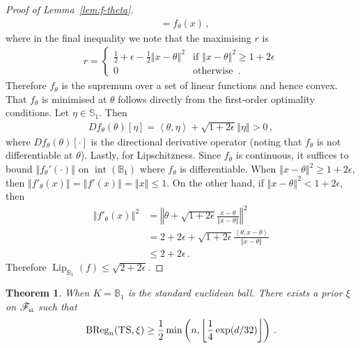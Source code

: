 \documentclass[letter, 12pt]{report}
\newcommand{\pb}{\text{\tiny\texttt{b}}}
\newcommand{\pl}{\text{\tiny\texttt{l}}}
\newcommand{\floor}[1]{\left\lfloor #1 \right\rfloor}
\newcommand{\ip}[1]{\left \langle #1 \right \rangle}
\newcommand{\BReg}{\textrm{BReg}}
\newcommand{\sphere}{\mathbb{S}}
\newcommand{\ball}{\mathbb{B}}
\newcommand{\norm}[1]{\left \Vert  #1 \right \Vert}
\newcommand{\sF}{\mathscr F}
\newcommand{\lip}{\operatorname{Lip}}
\newcommand{\interior}{\operatorname{int}}
\newcommand{\1}{\mathbf{1}}
\newcommand{\ts}{\textsc{TS}\xspace}
\theoremstyle{plain}
\newtheorem{theorem}{Theorem}
\theoremstyle{definition}
\theoremstyle{remark}
\begin{document}
\begin{proof}[Proof of Lemma~\ref{lem:f-theta}]
\begin{align}
         & = f_\theta(x) \,,\nonumber
    \end{align}
    where in the final inequality we note that the maximising $r$ is
    \begin{align*}
        r = \begin{cases}
                \frac{1}{2} + \epsilon - \frac{1}{2}\norm{x - \theta}^2 & \text{if } \norm{x - \theta}^2 \geq 1 + 2\epsilon \\
                0                                                       & \text{otherwise } \,.
            \end{cases}
    \end{align*}
    Therefore $f_\theta$ is the supremum over a set of linear functions and hence convex.
    That $f_\theta$ is minimised at $\theta$ follows directly from the first-order optimality conditions.
    Let $\eta \in \sphere_1$. Then
    \begin{align*}
        Df_\theta(\theta)[\eta] = \ip{\theta, \eta} + \sqrt{1 + 2 \epsilon} \norm{\eta} > 0 \,,
    \end{align*}
    where $Df_\theta(\theta)[\cdot]$ is the directional derivative operator (noting that $f_\theta$ is not differentiable at $\theta$).
    Lastly, for Lipschitzness. Since $f_\theta$ is continuous, it suffices to bound $\norm{f_\theta'(\cdot)}$ on $\interior(\ball_1)$ where $f_\theta$ is
    differentiable.
    When $\norm{x - \theta}^2 \geq 1 + 2 \epsilon$, then $\norm{f'_\theta(x)} = \norm{f'(x)} = \norm{x} \leq 1$.
    On the other hand, if $\norm{x - \theta}^2 < 1 + 2 \epsilon$, then
    \begin{align*}
        \norm{f'_\theta(x)}^2
         & = \norm{\theta + \sqrt{1 + 2\epsilon} \frac{x - \theta}{\norm{x - \theta}}}^2            \\
         & = 2 + 2\epsilon + \sqrt{1 + 2\epsilon} \frac{\ip{\theta, x - \theta}}{\norm{x - \theta}} \\
         & \leq 2 + 2\epsilon \,.
    \end{align*}
    Therefore $\lip_{\ball_1}(f) \leq \sqrt{2 + 2\epsilon}$.
\end{proof}

\begin{theorem}\label{thm:ts-lower}
    When $K = \ball_1$ is the standard euclidean ball.
    There exists a prior $\xi$ on $\sF_{\pb\pl}$ such that
    \begin{align*}
        \BReg_n(\ts, \xi) \geq \frac12 \min\left(n, \floor{\frac{1}{4} \exp(d/32)}\right)\,.
    \end{align*}
\end{theorem}
\end{document}
